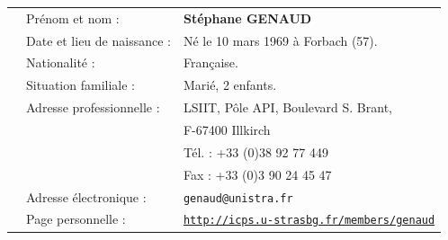 \documentclass[11pt]{article}
\begin{document}
\noindent
\begin{tabular}{llp{\linewidth}}

\hspace{1cm}	& Prénom et nom :			&\textbf{Stéphane GENAUD}\\
		 	& Date et lieu de naissance :	& Né le 10 mars 1969 à Forbach (57).\\
			& Nationalité :			& Française. \\
			& Situation familiale :		& Marié, 2 enfants. \\
			& Adresse professionnelle :	& LSIIT, Pôle API, Boulevard S. Brant,\\
			&      				& F-67400 Illkirch\\
			&					& Tél. : +33 (0)38 92 77 449\\ 
			&					& Fax  : +33 (0)3 90 24 45 47\\
			& Adresse électronique :	& \texttt{genaud@unistra.fr}\\
			& Page personnelle :		& \texttt{{\url{http://icps.u-strasbg.fr/members/genaud}}}\\[5mm]

\end{tabular}
\end{document}
